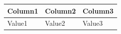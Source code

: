 \documentclass{article}
\begin{document}
\begin{longtable}{|l|l|l|}  %
\hline
Column1 & Column2 & Column3 \\  %
\hline
Value1 & Value2 & Value3 \\     %
\hline
\end{longtable}
\end{document}
